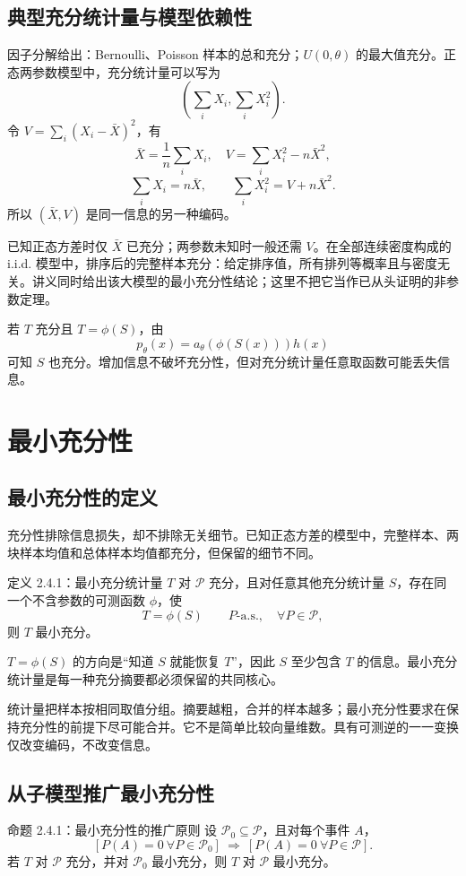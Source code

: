 \subsection{典型充分统计量与模型依赖性}
因子分解给出：Bernoulli、Poisson 样本的总和充分；$U(0,\theta)$ 的最大值充分。正态两参数模型中，充分统计量可以写为
\[
 \left(\sum_iX_i,\sum_iX_i^2\right).
\]
令 $V=\sum_i(X_i-\bar X)^2$，有
\[
 \bar X=\frac1n\sum_iX_i,\quad
 V=\sum_iX_i^2-n\bar X^2,
\]
\[
 \sum_iX_i=n\bar X,\qquad
 \sum_iX_i^2=V+n\bar X^2.
\]
所以 $(\bar X,V)$ 是同一信息的另一种编码。

已知正态方差时仅 $\bar X$ 已充分；两参数未知时一般还需 $V$。在全部连续密度构成的 i.i.d. 模型中，排序后的完整样本充分：给定排序值，所有排列等概率且与密度无关。讲义同时给出该大模型的最小充分性结论；这里不把它当作已从头证明的非参数定理。

若 $T$ 充分且 $T=\phi(S)$，由
\[
 p_\theta(x)=a_\theta(\phi(S(x)))h(x)
\]
可知 $S$ 也充分。增加信息不破坏充分性，但对充分统计量任意取函数可能丢失信息。

\section{最小充分性}

\subsection{最小充分性的定义}
充分性排除信息损失，却不排除无关细节。已知正态方差的模型中，完整样本、两块样本均值和总体样本均值都充分，但保留的细节不同。

\begin{definitionbox}{定义 2.4.1：最小充分统计量}
$T$ 对 $\mathcal P$ 充分，且对任意其他充分统计量 $S$，存在同一个不含参数的可测函数 $\phi$，使
\[
 T=\phi(S)\qquad P\text{-a.s.},\quad\forall P\in\mathcal P,
\]
则 $T$ 最小充分。
\end{definitionbox}

\begin{notebox}
$T=\phi(S)$ 的方向是“知道 $S$ 就能恢复 $T$”，因此 $S$ 至少包含 $T$ 的信息。最小充分统计量是每一种充分摘要都必须保留的共同核心。

统计量把样本按相同取值分组。摘要越粗，合并的样本越多；最小充分性要求在保持充分性的前提下尽可能合并。它不是简单比较向量维数。具有可测逆的一一变换仅改变编码，不改变信息。
\end{notebox}

\subsection{从子模型推广最小充分性}
\begin{definitionbox}{命题 2.4.1：最小充分性的推广原则}
设 $\mathcal P_0\subseteq\mathcal P$，且对每个事件 $A$，
\[
 [P(A)=0\ \forall P\in\mathcal P_0]
 \ \Longrightarrow\
 [P(A)=0\ \forall P\in\mathcal P].
\]
若 $T$ 对 $\mathcal P$ 充分，并对 $\mathcal P_0$ 最小充分，则 $T$ 对 $\mathcal P$ 最小充分。
\end{definitionbox}

